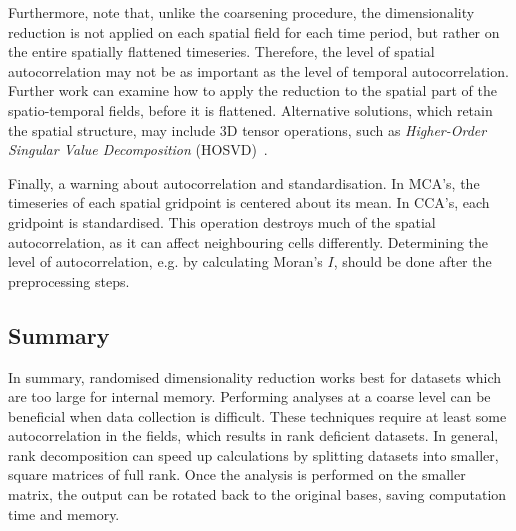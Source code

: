 \documentclass[ijgi,article,submit,moreauthors,pdftex,10pt,a4paper]{Definitions/mdpi}
\begin{document}
Furthermore, note that, unlike the coarsening procedure, the dimensionality reduction is not applied on each spatial field for each time period, but rather on the entire spatially flattened timeseries. Therefore, the level of spatial autocorrelation may not be as important as the level of temporal autocorrelation. Further work can examine how to apply the reduction to the spatial part of the spatio-temporal fields, before it is flattened. Alternative solutions, which retain the spatial structure, may include 3D tensor operations, such as \textit{Higher-Order Singular Value Decomposition} (HOSVD)~\cite{Tucker1964}.

Finally, a warning about autocorrelation and standardisation. In MCA's, the timeseries of each spatial gridpoint is centered about its mean. In CCA's, each gridpoint is standardised. This operation destroys much of the spatial autocorrelation, as it can affect neighbouring cells differently. Determining the level of autocorrelation, e.g. by calculating Moran's $I$, should be done after the preprocessing steps. 

\subsection{Summary}
\label{sec:Discussion/Summary}

In summary, randomised dimensionality reduction works best for datasets which are too large for internal memory. Performing analyses at a coarse level can be beneficial when data collection is difficult. These techniques require at least some autocorrelation in the fields, which results in rank deficient datasets. %
In general, rank decomposition can speed up calculations by splitting datasets into smaller, square matrices of full rank. Once the analysis is performed on the smaller matrix, the output can be rotated back to the original bases, saving computation time and memory.


\end{document}
